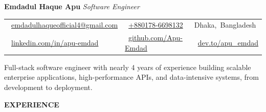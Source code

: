 \documentclass[a4paper]{article}
\newcommand{\icon}[1]{\BeginAccSupp{method=escape,ActualText={}}#1\EndAccSupp{}}
\newcommand{\bodyfont}{%
  \fontsize{11pt}{12.5pt}\selectfont
}
\newcommand{\sectionfont}{%
  \fontsize{11pt}{13pt}\selectfont\bfseries
}
\newcommand{\sectiontitle}[1]{%
  \par
  \vspace{8pt}
  {\sectionfont #1}\par
  \vspace{3pt}
}
\begin{document}
\bodyfont


{\fontsize{16pt}{19.2pt}\selectfont\bfseries
  Emdadul Haque Apu}
\hspace{6pt}
{\fontsize{13pt}{15.6pt}\selectfont\itshape
  Software Engineer}

\par\vspace{6pt}

\begin{tabular*}{\textwidth}{@{\extracolsep{\fill}}lll}
  \mbox{\icon{\faEnvelope}\hspace{6pt}
    \href{mailto:emdadulhaqueofficial4@gmail.com}
    {emdadulhaqueofficial4@gmail.com}}
  &
  \mbox{\icon{\faPhone}\hspace{6pt}
    \href{tel:+8801786698132}
    {+880178-6698132}}
  &
  \mbox{\icon{\faMapMarker*}\hspace{6pt}Dhaka, Bangladesh}
  \\
  [4pt]
  \mbox{\icon{\faLinkedin}\hspace{6pt}
    \href{https://linkedin.com/in/apu-emdad}
    {linkedin.com/in/apu-emdad}}
  &
  \mbox{\icon{\faGithub}\hspace{6pt}
    \href{https://github.com/Apu-Emdad}
    {github.com/Apu-Emdad}}
  &
  \mbox{\icon{\faDev}\hspace{6pt}
    \href{https://dev.to/apu_emdad}
    {dev.to/apu\_emdad}}
\end{tabular*}

\par\vspace{8pt}


Full-stack software engineer with nearly 4 years of experience building scalable enterprise applications, high-performance APIs, and data-intensive systems, from development to deployment.\par


\sectiontitle{EXPERIENCE}
\end{document}
